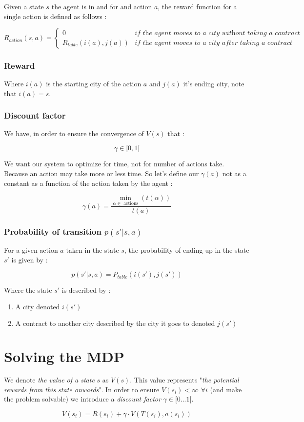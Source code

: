 \documentclass[11pt]{article}
\begin{document}
Given a state $s$ the agent is in and for and action $a$, the reward function for a single action is defined as follows :

\[R_{action}(s,a) = \begin{cases}
    0               & \textit{if the agent moves to a city without taking a contract} \\
    R_{table}(i(a),j(a))    & \textit{if the agent moves to a city after taking a contract}
\end{cases}\]

\subsubsection{Reward}

Where  $i(a)$ is the starting city of the action $a$ and $j(a)$ it's ending city, note that $i(a) = s$.

\subsubsection{Discount factor}

We have, in order to ensure the convergence of $V(s)$ that :

\[ \gamma \in [0,1[ \]

We want our system to optimize for time, not for number of actions take. Because an action may take more or less time. So let's define our $\gamma(a)$ not as a constant as a function of the action taken by the agent :

\[\gamma (a) = \frac{ \underset{\alpha \in \text{ actions}}{\min} (t(\alpha))}{t(a)}\]


\subsubsection{Probability of transition $p(s'|s,a)$}

For a given action $a$ taken in the state $s$, the probability of ending up in the state $s'$ is given by :

\[p(s'|s,a) = P_{table}(i(s'),j(s'))\]

Where the state $s'$ is described by : 
\begin{enumerate}
    \item A city denoted $i(s')$
    \item A contract to another city described by the city it goes to denoted $j(s')$
\end{enumerate}


\newpage

\section{Solving the MDP}

We denote \textit{the value of a state} $s$ as $V(s)$. This value represents "\textit{the potential rewards from this state onwards}". In order to ensure $V(s_i) < \infty$ $\forall i$ (and make the problem solvable) we introduce a \textit{discount factor} $\gamma \in [0 ... 1 [$.

\[V(s_i) = R(s_i) + \gamma \cdot V(T(s_i),a(s_i))\]
\end{document}
